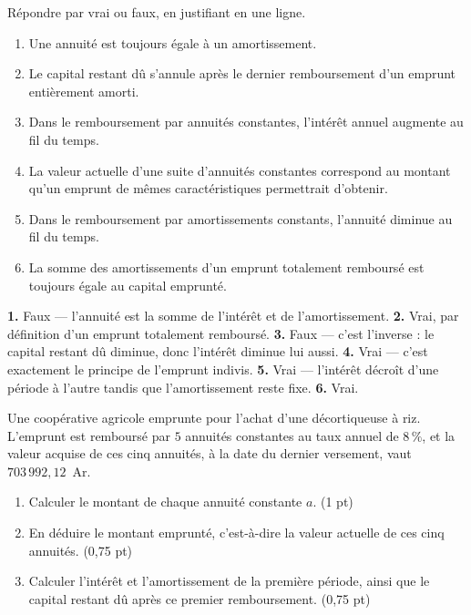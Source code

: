 \begin{jemeteste}
Répondre par vrai ou faux, en justifiant en une ligne.

\begin{enumerate}[label=\textbf{\arabic*.}, leftmargin=*, itemsep=0.28em]
  \item Une annuité est toujours égale à un amortissement.
  \item Le capital restant dû s'annule après le dernier remboursement d'un
        emprunt entièrement amorti.
  \item Dans le remboursement par annuités constantes, l'intérêt annuel
        augmente au fil du temps.
  \item La valeur actuelle d'une suite d'annuités constantes correspond au
        montant qu'un emprunt de mêmes caractéristiques permettrait
        d'obtenir.
  \item Dans le remboursement par amortissements constants, l'annuité
        diminue au fil du temps.
  \item La somme des amortissements d'un emprunt totalement remboursé est
        toujours égale au capital emprunté.
\end{enumerate}
\end{jemeteste}

\begin{corrige}[je me teste]
\textbf{1.} Faux — l'annuité est la somme de l'intérêt et de
l'amortissement.
\textbf{2.} Vrai, par définition d'un emprunt totalement remboursé.
\textbf{3.} Faux — c'est l'inverse : le capital restant dû diminue, donc
l'intérêt diminue lui aussi.
\textbf{4.} Vrai — c'est exactement le principe de l'emprunt indivis.
\textbf{5.} Vrai — l'intérêt décroît d'une période à l'autre tandis que
l'amortissement reste fixe.
\textbf{6.} Vrai.
\end{corrige}

\begin{commeaubac}
Une coopérative agricole emprunte pour l'achat d'une décortiqueuse à riz.
L'emprunt est remboursé par $5$ annuités constantes au taux annuel de
$8\,\%$, et la valeur acquise de ces cinq annuités, à la date du dernier
versement, vaut $703\,992{,}12$~Ar.

\begin{enumerate}[label=\textbf{\arabic*.}, leftmargin=*, itemsep=0.25em]
  \item Calculer le montant de chaque annuité constante $a$.
        \hfill\textup{(1 pt)}
  \item En déduire le montant emprunté, c'est-à-dire la valeur actuelle de
        ces cinq annuités. \hfill\textup{(0,75 pt)}
  \item Calculer l'intérêt et l'amortissement de la première période, ainsi
        que le capital restant dû après ce premier remboursement.
        \hfill\textup{(0,75 pt)}
\end{enumerate}
\end{commeaubac}

